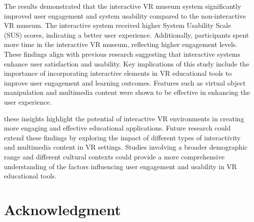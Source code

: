 \documentclass[conference]{IEEEtran}
\begin{document}
The results demonstrated that the interactive VR museum system significantly improved user engagement and system usability compared to the non-interactive VR museum. The interactive system received higher System Usability Scale (SUS) scores, indicating a better user experience. Additionally, participants spent more time in the interactive VR museum, reflecting higher engagement levels. These findings align with previous research suggesting that interactive systems enhance user satisfaction and usability. Key implications of this study include the importance of incorporating interactive elements in VR educational tools to improve user engagement and learning outcomes. Features such as virtual object manipulation and multimedia content were shown to be effective in enhancing the user experience.

these insights highlight the potential of interactive VR environments in creating more engaging and effective educational applications. Future research could extend these findings by exploring the impact of different types of interactivity and multimedia content in VR settings. Studies involving a broader demographic range and different cultural contexts could provide a more comprehensive understanding of the factors influencing user engagement and usability in VR educational tools.

\section*{Acknowledgment}





\end{document}
